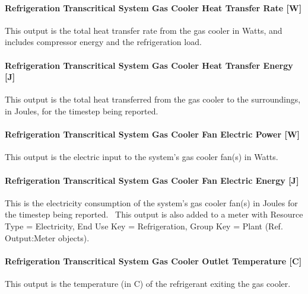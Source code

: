 \paragraph{Refrigeration Transcritical System Gas Cooler Heat Transfer Rate {[}W{]}}\label{refrigeration-transcritical-system-gas-cooler-heat-transfer-rate-w}

This output is the total heat transfer rate from the gas cooler in Watts, and includes compressor energy and the refrigeration load.

\paragraph{Refrigeration Transcritical System Gas Cooler Heat Transfer Energy {[}J{]}}\label{refrigeration-transcritical-system-gas-cooler-heat-transfer-energy-j}

This output is the total heat transferred from the gas cooler to the surroundings, in Joules, for the timestep being reported.

\paragraph{Refrigeration Transcritical System Gas Cooler Fan Electric Power {[}W{]}}\label{refrigeration-transcritical-system-gas-cooler-fan-electric-power-w}

This output is the electric input to the system's gas cooler fan(s) in Watts.

\paragraph{Refrigeration Transcritical System Gas Cooler Fan Electric Energy {[}J{]}}\label{refrigeration-transcritical-system-gas-cooler-fan-electric-energy-j}

This is the electricity consumption of the system's gas cooler fan(s) in Joules for the timestep being reported.~ This output is also added to a meter with Resource Type = Electricity, End Use Key = Refrigeration, Group Key = Plant (Ref. Output:Meter objects).

\paragraph{Refrigeration Transcritical System Gas Cooler Outlet Temperature {[}C{]}}\label{refrigeration-transcritical-system-gas-cooler-outlet-temperature-c}

This output is the temperature (in C) of the refrigerant exiting the gas cooler.

